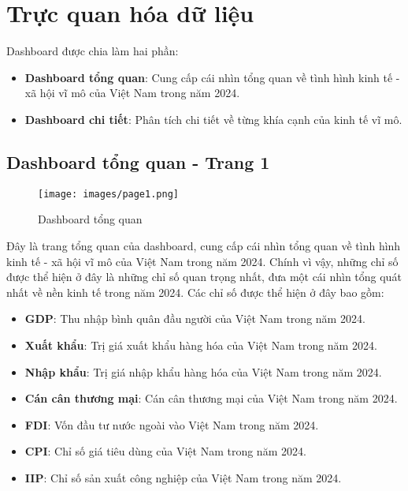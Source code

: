 \documentclass[a4paper]{report}
\begin{document}
{{\newpage
\section{Trực quan hóa dữ liệu}
Dashboard được chia làm hai phần:
\begin{itemize}
    \item \textbf{Dashboard tổng quan}: Cung cấp cái nhìn tổng quan về tình hình kinh tế - xã hội vĩ mô của Việt Nam trong năm 2024.
    \item \textbf{Dashboard chi tiết}: Phân tích chi tiết về từng khía cạnh của kinh tế vĩ mô.
\end{itemize}


\subsection{Dashboard tổng quan - Trang 1}

\begin{figure}[H]
    \centering
    \texttt{[image: images/page1.png]}
    \caption{Dashboard tổng quan}
\end{figure}

Đây là trang tổng quan của dashboard, cung cấp cái nhìn tổng quan về tình hình kinh tế - xã hội vĩ mô của Việt Nam trong năm 2024. Chính vì vậy, những chỉ số được thể hiện ở đây là những chỉ số quan trọng nhất, đưa một cái nhìn tổng quát nhất về nền kinh tế trong năm 2024. Các chỉ số được thể hiện ở đây bao gồm:
\begin{itemize}
    \item \textbf{GDP}: Thu nhập bình quân đầu người của Việt Nam trong năm 2024.
    \item \textbf{Xuất khẩu}: Trị giá xuất khẩu hàng hóa của Việt Nam trong năm 2024.
    \item \textbf{Nhập khẩu}: Trị giá nhập khẩu hàng hóa của Việt Nam trong năm 2024.
    \item \textbf{Cán cân thương mại}: Cán cân thương mại của Việt Nam trong năm 2024.
    \item \textbf{FDI}: Vốn đầu tư nước ngoài vào Việt Nam trong năm 2024.
    \item \textbf{CPI}: Chỉ số giá tiêu dùng của Việt Nam trong năm 2024.
    \item \textbf{IIP}: Chỉ số sản xuất công nghiệp của Việt Nam trong năm 2024.
\end{itemize}

}}
\end{document}

